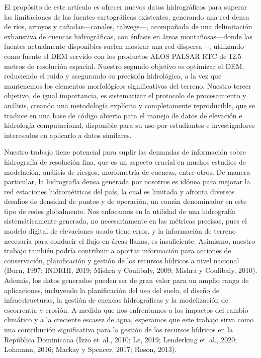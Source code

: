 \documentclass[spanish]{article}
\begin{document}
El propósito de este artículo es ofrecer nuevos datos hidrográficos para
superar las limitaciones de las fuentes cartográficas existentes,
generando una red densa de ríos, arroyos y cañadas---canales,
talwegs---, acompañada de una delimitación exhaustiva de cuencas
hidrográficas, con énfasis en áreas montañosas---donde las fuentes
actualmente disponibles suelen mostrar una red dispersa---, utilizando
como fuente el DEM servido con los productos ALOS PALSAR RTC de 12.5
metros de resolución espacial. Nuestro segundo objetivo es optimizar el
DEM, reduciendo el ruido y asegurando su precisión hidrológica, a la vez
que mantenemos los elementos morfológicos significativos del terreno.
Nuestro tercer objetivo, de igual importancia, es sistematizar el
protocolo de procesamiento y análisis, creando una metodología explícita
y completamente reproducible, que se traduce en una base de código
abierto para el manejo de datos de elevación e hidrología computacional,
disponible para su uso por estudiantes e investigadores interesados en
aplicarlo a datos similares.

Nuestro trabajo tiene potencial para suplir las demandas de información
sobre hidrografía de resolución fina, que es un aspecto crucial en
muchos estudios de modelación, análisis de riesgos, morfometría de
cuencas, entre otros. De manera particular, la hidrografía densa
generada por nosotros es idónea para mejorar la red estaciones
hidrométricas del país, la cual es limitada y afronta diversos desafíos
de densidad de puntos y de operación, un común denominador en este tipo
de redes globalmente. Nos enfocamos en la utilidad de una hidrografía
sistemáticamente generada, no necesariamente en las métricas precisas,
pues el modelo digital de elevaciones usado tiene error, y la
información de terreno necesaria para conducir el flujo en áreas llanas,
es insuficiente. Asimismo, nuestro trabajo también podría contribuir a
aportar información para acciones de conservación, planificación y
gestión de los recursos hídricos a nivel nacional (Burn, 1997; INDRHI,
2019; Mishra y Coulibaly, 2009; Mishra y Coulibaly, 2010). Además, los
datos generados pueden ser de gran valor para un amplio rango de
aplicaciones, incluyendo la planificación del uso del suelo, el diseño
de infraestructuras, la gestión de cuencas hidrográficas y la
modelización de escorrentía y erosión. A medida que nos enfrentamos a
los impactos del cambio climático y a la creciente escasez de agua,
esperamos que este trabajo sirva como una contribución significativa
para la gestión de los recursos hídricos en la República Dominicana
(Izzo et~al., 2010; Le, 2019; Lenderking et~al., 2020; Lohmann, 2016;
Mackay y Spencer, 2017; Roson, 2013).
\end{document}

